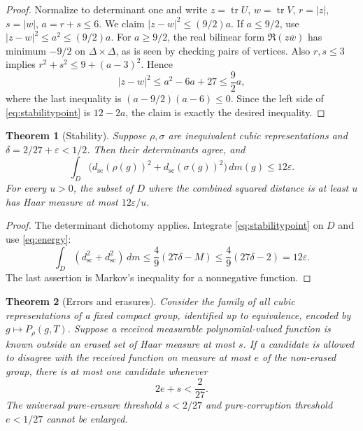 \documentclass[11pt]{article}
\newtheorem{theorem}{Theorem}[section]
\theoremstyle{definition}\newtheorem{definition}[theorem]{Definition}
\theoremstyle{remark}\newtheorem{remark}[theorem]{Remark}
\newcommand{\tr}{\operatorname{tr}}\newcommand{\Gal}{\operatorname{Gal}}\newcommand{\diag}{\operatorname{diag}}
\newcommand{\scal}{\mathrm{sc}}\newcommand{\dist}{\operatorname{dist}}\newcommand{\id}{\mathrm{id}}
\begin{document}
\begin{proof}
Normalize to determinant one and write $z=\tr U$, $w=\tr V$, $r=|z|$, $s=|w|$, $a=r+s\le6$. We claim $|z-w|^2\le(9/2)a$. If $a\le9/2$, use $|z-w|^2\le a^2\le(9/2)a$. For $a\ge9/2$, the real bilinear form $\Re(z\overline w)$ has minimum $-9/2$ on $\Delta\times\Delta$, as is seen by checking pairs of vertices. Also $r,s\le3$ implies $r^2+s^2\le9+(a-3)^2$. Hence
\[
 |z-w|^2\le a^2-6a+27\le\frac92a,
\]
where the last inequality is $(a-9/2)(a-6)\le0$. Since the left side of \eqref{eq:stabilitypoint} is $12-2a$, the claim is exactly the desired inequality.
\end{proof}

\begin{theorem}[Stability]\label{thm:stability}
Suppose $\rho,\sigma$ are inequivalent cubic representations and
$\delta=2/27+\varepsilon<1/2$. Then their determinants agree, and
\begin{equation}\label{eq:stability}
 \boxed{\int_D\bigl(d_{\scal}(\rho(g))^2+d_{\scal}(\sigma(g))^2\bigr)\,dm(g)
 \le12\varepsilon.}
\end{equation}
For every $u>0$, the subset of $D$ where the combined squared distance is at least $u$ has Haar measure at most $12\varepsilon/u$.
\end{theorem}

\begin{proof}
The determinant dichotomy applies. Integrate \eqref{eq:stabilitypoint} on $D$ and use \eqref{eq:energy}:
\[
 \int_D(d_{\scal}^2+d_{\scal}^2)\,dm
 \le\frac49(27\delta-M)\le\frac49(27\delta-2)=12\varepsilon.
\]
The last assertion is Markov's inequality for a nonnegative function.
\end{proof}

\begin{theorem}[Errors and erasures]\label{thm:decoding}
Consider the family of all cubic representations of a fixed compact group, identified up to equivalence, encoded by $g\mapsto P_\rho(g,T)$. Suppose a received measurable polynomial-valued function is known outside an erased set of Haar measure at most $s$. If a candidate is allowed to disagree with the received function on measure at most $e$ of the non-erased group, there is at most one candidate whenever
\begin{equation}\label{eq:decoding}
 2e+s<\frac{2}{27}.
\end{equation}
The universal pure-erasure threshold $s<2/27$ and pure-corruption threshold $e<1/27$ cannot be enlarged.
\end{theorem}
\end{document}
